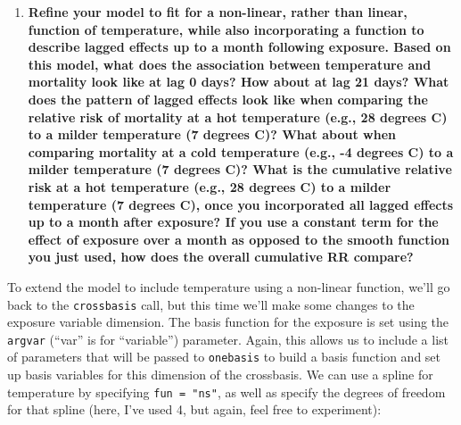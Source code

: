 \documentclass[
]{book}
\newenvironment{Shaded}{\begin{snugshade}}{\end{snugshade}}
\newcommand{\AttributeTok}[1]{\textcolor[rgb]{0.77,0.63,0.00}{#1}}
\newcommand{\DecValTok}[1]{\textcolor[rgb]{0.00,0.00,0.81}{#1}}
\newcommand{\FunctionTok}[1]{\textcolor[rgb]{0.00,0.00,0.00}{#1}}
\newcommand{\NormalTok}[1]{#1}
\newcommand{\OtherTok}[1]{\textcolor[rgb]{0.56,0.35,0.01}{#1}}
\newcommand{\SpecialCharTok}[1]{\textcolor[rgb]{0.00,0.00,0.00}{#1}}
\newcommand{\StringTok}[1]{\textcolor[rgb]{0.31,0.60,0.02}{#1}}
\providecommand{\tightlist}{%
  \setlength{\itemsep}{0pt}\setlength{\parskip}{0pt}}
\begin{document}
\begin{enumerate}
\def\labelenumi{\arabic{enumi}.}
\setcounter{enumi}{2}
\tightlist
\item
  \textbf{Refine your model to fit for a non-linear, rather than linear, function
  of temperature, while also incorporating a function to describe lagged effects up
  to a month following exposure. Based on this model, what does the association
  between temperature and mortality look like at lag 0 days? How about at lag 21 days?
  What does the pattern of lagged effects look like when comparing the relative risk of
  mortality at a hot temperature (e.g., 28 degrees C) to a milder temperature
  (7 degrees C)? What about when comparing mortality at a cold temperature
  (e.g., -4 degrees C) to a milder temperature (7 degrees C)? What is the
  cumulative relative risk at a hot temperature (e.g., 28 degrees C) to a
  milder temperature (7 degrees C), once you incorporated all lagged effects
  up to a month after exposure? If you use a constant term for the effect of exposure
  over a month as opposed to the smooth function you just used, how does the overall
  cumulative RR compare?}
\end{enumerate}

To extend the model to include temperature using a non-linear function, we'll go back
to the \texttt{crossbasis} call, but this time we'll make some changes to the exposure variable
dimension. The basis function for the exposure is set using the \texttt{argvar} (``var'' is
for ``variable'') parameter. Again, this allows us to include a list of parameters that
will be passed to \texttt{onebasis} to build a basis function and set up basis variables for
this dimension of the crossbasis. We can use a spline for temperature by specifying
\texttt{fun\ =\ "ns"}, as well as specify the degrees of freedom for that spline (here, I've used
4, but again, feel free to experiment):

\begin{Shaded}
\end{Shaded}
\end{document}
